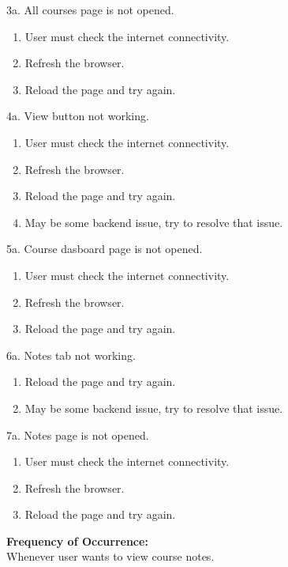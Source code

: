 3a. All courses page is not opened.
\begin{enumerate}
\item User must check the internet connectivity.
\item Refresh the browser.
\item Reload the page and try again.
\end{enumerate}
4a. View button not working.
\begin{enumerate}
\item User must check the internet connectivity.
\item Refresh the browser.
\item Reload the page and try again.
\item May be some backend issue, try to resolve that issue.
\end{enumerate}
5a. Course dasboard page is not opened.
\begin{enumerate}
\item User must check the internet connectivity.
\item Refresh the browser.
\item Reload the page and try again.
\end{enumerate}
6a. Notes tab not working.
\begin{enumerate}
\item Reload the page and try again.
\item May be some backend issue, try to resolve that issue.
\end{enumerate}
7a. Notes page is not opened.
\begin{enumerate}
\item User must check the internet connectivity.
\item Refresh the browser.
\item Reload the page and try again.
\end{enumerate}
\textbf{Frequency of Occurrence:}\\
Whenever user wants to view course notes.




